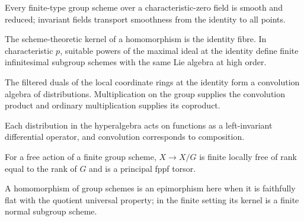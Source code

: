 \begin{theorem}
\label{mumford3-char-zero-smoothness}
Every finite-type group scheme over a characteristic-zero field is smooth and
reduced; invariant fields transport smoothness from the identity to all points.
\notready
\end{theorem}

\begin{definition}
\label{mumford3-subgroup-kernel-neighborhoods}
The scheme-theoretic kernel of a homomorphism is the identity fibre.  In
characteristic $p$, suitable powers of the maximal ideal at the identity define
finite infinitesimal subgroup schemes with the same Lie algebra at high order.
\notready
\end{definition}

\begin{definition}[Hyperalgebra]
\label{mumford3-hyperalgebra}
The filtered duals of the local coordinate rings at the identity form a
convolution algebra of distributions.  Multiplication on the group supplies
the convolution product and ordinary multiplication supplies its coproduct.
\notready
\end{definition}

\begin{proposition}
\label{mumford3-invariant-differential-operators}
Each distribution in the hyperalgebra acts on functions as a left-invariant
differential operator, and convolution corresponds to composition.
\notready
\end{proposition}

\begin{proposition}
\label{mumford3-free-quotient-flatness}
For a free action of a finite group scheme, $X\to X/G$ is finite locally free
of rank equal to the rank of $G$ and is a principal fppf torsor.
\notready
\end{proposition}

\begin{definition}
\label{mumford3-finite-epimorphism}
A homomorphism of group schemes is an epimorphism here when it is faithfully
flat with the quotient universal property; in the finite setting its kernel is
a finite normal subgroup scheme.
\notready
\end{definition}

